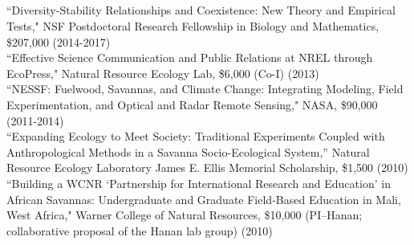 \documentclass[margin,line]{resume}
\begin{document}
\begin{resume}
	
    \section{\textmd{\textsf{}}}
    ``Diversity-Stability Relationships and Coexistence: New Theory and Empirical Tests," NSF Postdoctoral Research Fellowship in Biology and Mathematics, \$207,000 (2014-2017)\vspace{2mm}\\%
    ``Effective Science Communication and Public Relations at NREL through EcoPress," Natural Resource Ecology Lab, \$6,000 (Co-I) (2013) \vspace{2mm}\\%
    ``NESSF: Fuelwood, Savannas, and Climate Change: Integrating Modeling, Field Experimentation, and Optical and Radar Remote Sensing," NASA, \$90,000 (2011-2014) \vspace{2mm}\\%
    ``Expanding Ecology to Meet Society: Traditional Experiments Coupled with Anthropological Methods in a Savanna Socio-Ecological System,'' Natural Resource Ecology Laboratory James E. Ellis Memorial Scholarship, \$1,500 (2010)\vspace{2mm}\\%
    ``Building a WCNR `Partnership for International Research and Education' in African Savannas: Undergraduate and Graduate Field-Based Education in Mali, West Africa," Warner College of Natural Resources, \$10,000 (PI--Hanan; collaborative proposal of the Hanan lab group) (2010)%
    

\end{resume}
\end{document}
